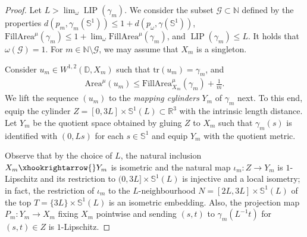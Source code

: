 \documentclass[a4paper,leqno]{amsart}
\numberwithin{equation}{section}
\theoremstyle{remark}
\theoremstyle{remark}
\newcommand{\N}{\mathbb{N}}
\DeclareMathOperator{\LIP}{LIP}
\begin{document}
\begin{proof}
Let $L > \lim\nolimits_{\omega} \LIP( \gamma_m )$. We consider the subset $\mathcal{G} \subset \mathbb{N}$ defined by the properties $d( p_m, \gamma_m( \mathbb{S}^1 ) ) \leq 1 + d( p_\omega, \gamma( \mathbb{S}^1 ) )$, $\mathrm{FillArea}^{\mu}( \gamma_m ) \leq 1 + \lim\nolimits_{\omega} \mathrm{FillArea}^{\mu}( \gamma_m )$, and $\LIP( \gamma_m ) \leq L$. It holds that $\omega( \mathcal{G} ) = 1$. For $m \in \N \setminus \mathcal{G}$, we may assume that $X_m$ is a singleton.

Consider $u_m \in W^{1,2}( \mathbb{D}, X_m )$ such that $\mathrm{tr}(u_m) = \gamma_m$, and
\begin{align}\label{equation-filling-area-almost-optimal}
    \mathrm{Area}^{\mu}( u_m ) \leq \mathrm{FillArea}^{\mu}_{X_m}( \gamma_m ) + \frac{ 1 }{ m }.
\end{align}
We lift the sequence $( u_m )$ to the \emph{mapping cylinders} $Y_m$ of $\gamma_m$ next. To this end, equip the cylinder $Z = [0,3L] \times \mathbb{S}^{1}(L) \subset \mathbb{R}^3$ with the intrinsic length distance. Let $Y_m$ be the quotient space obtained by gluing $Z$ to $X_m$ such that $\gamma_m(s)$ is identified with $( 0, Ls )$ for each $s \in \mathbb{S}^{1}$ and equip $Y_m$ with the quotient metric.

Observe that by the choice of $L$, the natural inclusion $X_m \xhookrightarrow{} Y_m$ is isometric and the natural map $\iota_m \colon Z \rightarrow Y_m$ is $1$-Lipschitz and its restriction to $(0,3L] \times \mathbb{S}^{1}(L)$ is injective and a local isometry; in fact, the restriction of $\iota_m$ to the $L$-neighbourhood $N = [2L,3L] \times \mathbb{S}^{1}(L)$ of the top $T = \{3L\} \times \mathbb{S}^{1}(L)$ is an isometric embedding. Also, the projection map $P_m \colon Y_m \to X_m$ fixing $X_m$ pointwise and sending $(s,t)$ to $\gamma_m(L^{-1}t)$ for $(s,t) \in Z$ is $1$-Lipschitz. 


\end{proof}
\end{document}
